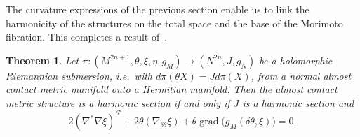 \documentclass[a4paper,reqno]{amsart}
\newtheorem{theorem}[thm]{Theorem}
\theoremstyle{definition}
\theoremstyle{remark}
\theoremstyle{plain}
\numberwithin{equation}{section}
\def\grad{\operatorname {grad}}
\newcommand{\f}{\mathcal{F}}
\begin{document}
The curvature expressions of the previous section enable us to
link the harmonicity of the structures on the total space and the
base of the Morimoto fibration.  This completes a result
of~\cite{VW2}.


\begin{theorem} \label{thm4.1} Let
  $\pi: (M^{2n+1},\theta, \xi, \eta, g_M)\longrightarrow
  (N^{2n}, J, g_N)$ be a holomorphic Riemannian
  submersion, i.e.~with $d\pi (\theta X) =  J d\pi (X)$,
  from a normal almost contact metric manifold onto a Hermitian
  manifold. Then the almost contact metric structure is a harmonic
  section if and only if $ J$ is a harmonic section and
  $$
  2(\nabla^{*}\nabla \xi )^{\f} +2 \theta(\nabla_{\delta \theta} \xi)
  +\theta\grad \big( g_M(\delta \theta ,\xi)\big)=0.
  $$ 
\end{theorem}
\end{document}
